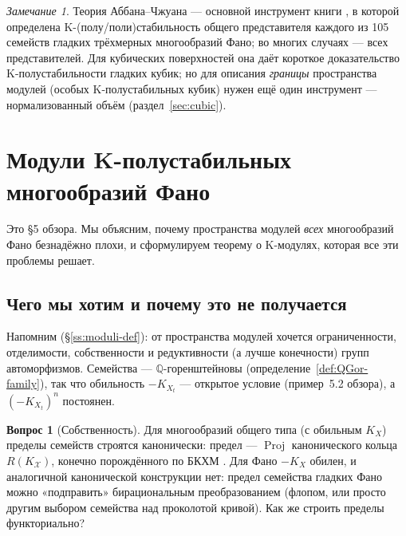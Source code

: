 \documentclass[11pt,a4paper]{article}
\theoremstyle{plain}
\theoremstyle{definition}
\newtheorem{question}[theorem]{Вопрос}
\theoremstyle{remark}
\newtheorem{remark}[theorem]{Замечание}
\newcommand{\Q}{\mathbb{Q}}
\newcommand{\cX}{\mathcal{X}}
\DeclareMathOperator{\Proj}{Proj}
\begin{document}
\begin{remark}
Теория Аббана--Чжуана --- основной инструмент книги \cite{ACCFKMSV}, в которой определена
K-(полу/поли)стабильность общего представителя каждого из 105 семейств гладких трёхмерных
многообразий Фано; во многих случаях --- всех представителей. Для кубических поверхностей она даёт
короткое доказательство K-полустабильности гладких кубик; но для описания \emph{границы}
пространства модулей (особых K-полустабильных кубик) нужен ещё один инструмент --- нормализованный
объём (раздел~\ref{sec:cubic}).
\end{remark}

\section{Модули K-полустабильных многообразий Фано}\label{sec:moduli}

Это \S5 обзора. Мы объясним, почему пространства модулей \emph{всех} многообразий Фано безнадёжно
плохи, и сформулируем теорему о K-модулях, которая все эти проблемы решает.

\subsection{Чего мы хотим и почему это не получается}

Напомним (\S\ref{ss:moduli-def}): от пространства модулей хочется ограниченности, отделимости,
собственности и редуктивности (а лучше конечности) групп автоморфизмов. Семейства --- 
$\Q$-горенштейновы (определение~\ref{def:QGor-family}), так что обильность $-K_{X_t}$ --- открытое
условие (пример~5.2 обзора), а $(-K_{X_t})^n$ постоянен.

\begin{question}[Собственность]
Для многообразий общего типа (с обильным $K_X$) пределы семейств строятся канонически: предел ---
$\Proj$ канонического кольца $R(K_{\cX})$, конечно порождённого по БКХМ \cite{BCHM}. Для Фано
$-K_X$ обилен, и аналогичной канонической конструкции нет: предел семейства гладких Фано можно
«подправить» бирациональным преобразованием (флопом, или просто другим выбором семейства над
проколотой кривой). Как же строить пределы функториально?
\end{question}
\end{document}
